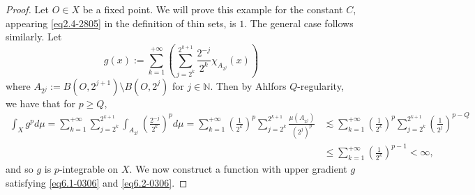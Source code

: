 \documentclass[10pt]{amsart}
\numberwithin{equation}{section}
\begin{document}
\begin{proof}
Let $O\in X$ be a fixed point.
We will prove this example for the constant $C$, appearing \eqref{eq2.4-2805} in the definition of thin sets, is $1$. The general case follows similarly. 
	Let 
	\[
	 g(x):=\sum_{k=1}^{+\infty} \left(\sum_{j=2^{k}}^{2^{k+1}} \frac{2^{-j}}{2^k}\chi_{A_{2^{j}}}(x) \right)
	\]
	where $A_{ 2^{j}}:=B(O, 2^{j+1})\setminus B(O, 2^{j})$ for $j\in \mathbb N$. Then by Ahlfors $Q$-regularity, we have that for $p\geq Q,$
	\begin{align*}
	\int_{X}g^pd\mu=\sum_{k=1}^{+\infty}\sum_{j=2^k}^{2^{k+1}} \int_{A_{ 2^{j}}} \left(\frac{2^{-j}}{2^k}\right)^pd\mu=\sum_{k=1}^{+\infty}\left(\frac{1}{2^k}\right)^p\sum_{j=2^k}^{2^{k+1}}\frac{\mu(A_{2^j})}{(2^j)^p} &\lesssim \sum_{k=1}^{+\infty} \left(\frac{1}{2^k}\right)^{p}\sum_{j=2^k}^{2^{k+1}}\left(\frac{1}{2^j}\right)^{p-Q}\\
    &\le\sum_{k=1}^{+\infty}\left(\frac{1}{2^k}\right)^{p-1}<\infty,
	\end{align*}
	and so $g$ is $p$-integrable on $X$. We now construct a function with upper gradient $g$ satisfying \eqref{eq6.1-0306} and \eqref{eq6.2-0306}. 
 

\end{proof}
\end{document}
